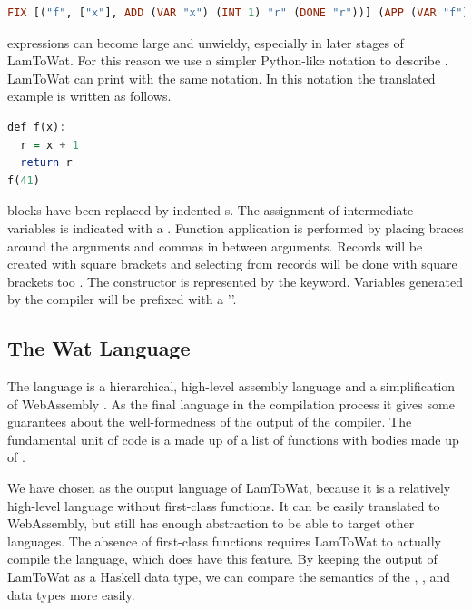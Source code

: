 {\begin{lstlisting}[language=Haskell]
  FIX [("f", ["x"], ADD (VAR "x") (INT 1) "r" (DONE "r"))] (APP (VAR "f") [INT 41])
\end{lstlisting}

 expressions can become large and unwieldy, especially in later stages of LamToWat. For this reason we use a simpler Python-like notation to describe . LamToWat can print  with the same notation. In this notation the translated example is written as follows.

\begin{lstlisting}[language=Haskell]
def f(x):
  r = x + 1
  return r
f(41)
\end{lstlisting}

 blocks have been replaced by indented s. The assignment of intermediate variables is indicated with a \icode{=}. Function application is performed by placing braces around the arguments and commas in between arguments. Records will be created with square brackets \icode{[1,2,3]} and selecting from records will be done with square brackets too . The  constructor is represented by the  keyword. Variables generated by the compiler will be prefixed with a '\icode{_}'.

\subsection{\label{subsection:webdata}The Wat Language}
The  language is a hierarchical, high-level assembly language and a simplification of WebAssembly \autocite{webassemblyhomepage}. As the final language in the compilation process it gives some guarantees about the well-formedness of the output of the compiler. The fundamental unit of code is a  made up of a list of functions with bodies made up of .

We have chosen  as the output language of LamToWat, because it is a relatively high-level language without first-class functions. It can be easily translated to WebAssembly, but still has enough abstraction to be able to target other languages. The absence of first-class functions requires LamToWat to actually compile the  language, which does have this feature. By keeping the output of LamToWat as a Haskell data type, we can compare the semantics of the , , and  data types more easily.

}
